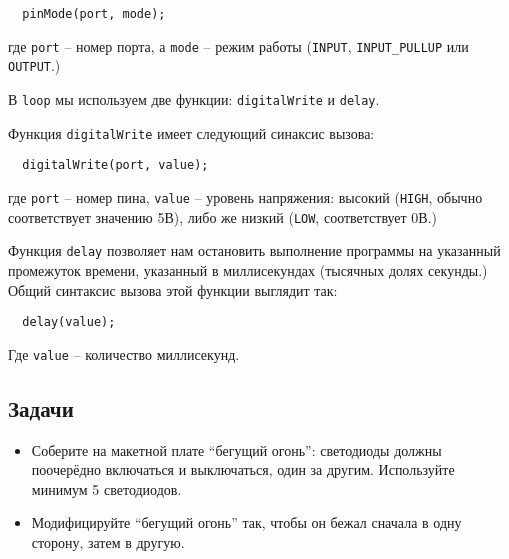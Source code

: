 \documentclass[../sparc.tex]{subfiles}
\begin{document}
\begin{verbatim}
  pinMode(port, mode);
\end{verbatim}

где \texttt{port} -- номер порта, а \texttt{mode} -- режим работы (\texttt{INPUT},
\texttt{INPUT\_PULLUP} или \texttt{OUTPUT}.)

В \texttt{loop} мы используем две функции: \texttt{digitalWrite} и
\texttt{delay}.

Функция \texttt{digitalWrite} имеет следующий синаксис вызова:

\begin{verbatim}
  digitalWrite(port, value);
\end{verbatim}

где \texttt{port} -- номер пина, \texttt{value} -- уровень напряжения: высокий
(\texttt{HIGH}, обычно соответствует значению 5В), либо же низкий (\texttt{LOW},
соответствует 0В.)

Функция \texttt{delay} позволяет нам остановить выполнение программы на
указанный промежуток времени, указанный в миллисекундах (тысячных долях
секунды.)  Общий синтаксис вызова этой функции выглядит так:

\begin{verbatim}
  delay(value);
\end{verbatim}

Где \texttt{value} -- количество миллисекунд.

\subsection{Задачи}
\begin{itemize}
\item Соберите на макетной плате ``бегущий огонь'': светодиоды должны поочерёдно
  включаться и выключаться, один за другим.  Используйте минимум 5 светодиодов.
\item Модифицируйте ``бегущий огонь'' так, чтобы он бежал сначала в одну
  сторону, затем в другую.
\end{itemize}
\end{document}

